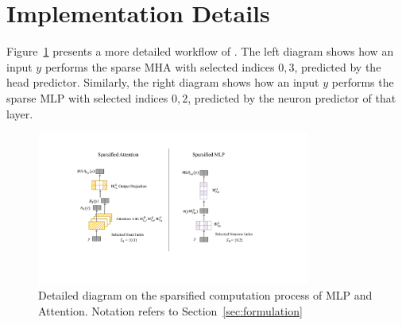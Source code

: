 \section{Implementation Details}
\label{appendix:method}

Figure~\ref{fig:sparse_computation_diagram} presents a more detailed workflow of \name{}. The left diagram shows how an input $y$ performs the sparse MHA with selected indices ${0, 3}$, predicted by the head predictor. Similarly, the right diagram shows how an input $y$ performs the sparse MLP with selected indices ${0, 2}$, predicted by the neuron predictor of that layer.

\begin{figure}[h]
  \centering
  \includegraphics[width=0.8\textwidth]{figure/sparse_computation_diagram.pdf}
  \caption{Detailed diagram on the sparsified computation process of MLP and Attention. Notation refers to Section~\ref{sec:formulation}}
  \label{fig:sparse_computation_diagram}
\end{figure}

